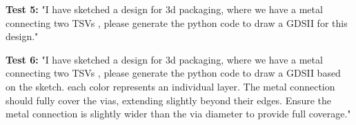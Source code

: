 \documentclass{article}
\begin{document}
\textbf{Test 5:} "I have sketched a design for 3d packaging, where we have a metal connecting two TSVs , please generate the python code to draw a GDSII for this design."

\textbf{Test 6:} "I have sketched a design for 3d packaging, where we have a metal connecting two TSVs , please generate the python code to draw a GDSII based on the sketch. each color represents an individual layer. The metal connection should fully cover the vias, extending slightly beyond their edges. Ensure the metal connection is slightly wider than the via diameter to provide full coverage."
\end{document}

